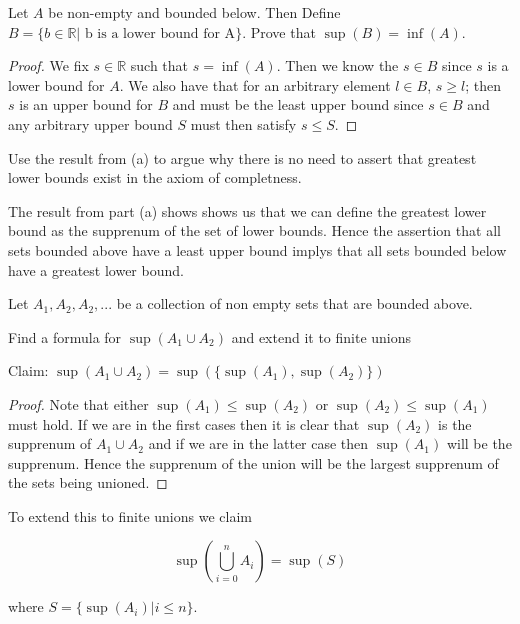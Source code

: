 \documentclass[11pt,largemargins]{homework}
\newcommand{\R}{\mathbb{R}}
\begin{document}
\question 

\begin{alphaparts}
    \questionpart 
    Let $A$ be non-empty and bounded below. Then
    Define $B = \{ b \in \R | \text{ b is a lower bound for A} \}$. Prove that 
    $\sup(B) = \inf(A)$. 

    \begin{proof}
        We fix $s \in \R$ such that $s = \inf(A)$. Then we know the $s \in B$ since $s$ is a lower bound for $A$. We also have that 
        for an arbitrary element $l \in B$, $s \geq l$; then $s$ is an upper bound for $B$ and must be the least upper bound since 
        $s \in B$ and any arbitrary upper bound $S$ must then satisfy $s \leq S$. 
    \end{proof}

    \questionpart 
    Use the result from (a) to argue why there is no need to assert that greatest lower bounds exist in the axiom of completness. 

    The result from part (a) shows shows us that we can define the greatest lower bound as the supprenum of the set of lower bounds. 
    Hence the assertion that all sets bounded above have a least upper bound implys that all sets bounded below have a greatest lower bound. 
\end{alphaparts}

\question 
Let $A_1, A_2, A_2, ... $ be a collection of non empty sets that are bounded above. 

\begin{alphaparts}
    \questionpart
    Find a formula for $\sup(A_1 \cup A_2)$ and extend it to finite unions 

    Claim: $\sup(A_1 \cup A_2) = \sup(\{\sup(A_1), \sup(A_2)\})$

    \begin{proof}
        Note that either $\sup(A_1) \leq \sup(A_2)$ or $\sup(A_2) \leq \sup(A_1)$ must hold. If we are in the first cases then 
        it is clear that $\sup(A_2)$ is the supprenum of $A_1 \cup A_2$ and if we are in the latter case then $\sup(A_1)$ will be the supprenum. 
        Hence the supprenum of the union will be the largest supprenum of the sets being unioned. 
    \end{proof}

    To extend this to finite unions we claim 

    \[\sup(\bigcup_{i = 0}^n A_i) = \sup(S) \] 

    where $S = \{ \sup(A_i) | i \leq n \}$. 
\end{alphaparts}
\end{document}
